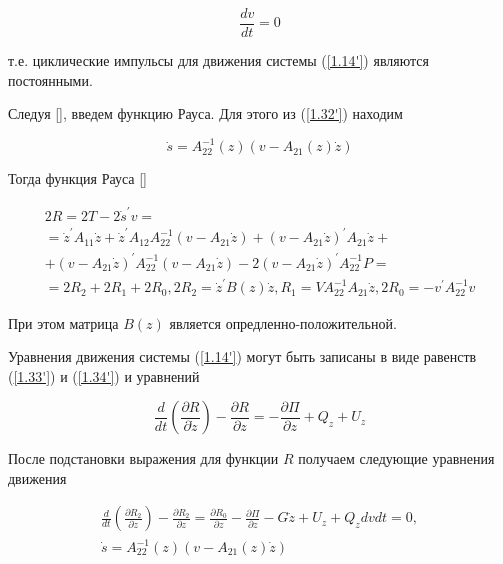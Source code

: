 \begin{equation} \label{1.33'}
\frac{d v}{d t} = 0
\end{equation}

т.е. циклические импульсы для движения системы (\ref{1.14'}) являются постоянными.

Следуя [], введем функцию Рауса. Для этого из (\ref{1.32'}) находим

\begin{equation} \label{1.34'}
\dot s = A_{22}^{-1} (z) (v - A_{21} (z) \dot z)
\end{equation}

Тогда функция Рауса [] 

\begin{equation} \label{1.35'}
\begin{array}{c}
	2R = 2T - 2 \dot s^{'} v =\\
	= \dot z^{'} A_{11} \dot z + \dot z^{'} A_{12} A_{22}^{-1} (v - A_{21} \dot z) + (v - A_{21} \dot z)^{'} A_{21} \dot z +\\
	+ (v - A_21 \dot z)^{'} A_{22}^{-1} (v - A_{21} \dot z) - 2 (v - A_{21} \dot z)^{'} A_{22}^{-1} P =\\
	= 2 R_2 + 2 R_1 + 2 R_0, 2 R_2 = \dot z^{'} B (z) \dot z, R_1 = V A_{22}^{-1} A_{21} \dot z, 2 R_0 = - v^{'} A_{22}^{-1} v
\end{array}
\end{equation}

При этом матрица $B(z)$ является опредленно-положительной.

Уравнения движения системы (\ref{1.14'}) могут быть записаны в виде равенств (\ref{1.33'}) и (\ref{1.34'}) и уравнений

\begin{equation} \label{1.36'}
\frac{d}{dt} (\frac{\partial R}{\partial \dot z}) - \frac{\partial R}{\partial z} = - \frac{\partial \Pi}{\partial z} + Q_z + U_z
\end{equation}

После подстановки выражения для функции $R$ получаем следующие уравнения движения 

\begin{equation} \label{1.37'}
\begin{array}{c}
\frac{d}{dt} (\frac{\partial R_2}{\partial \dot z}) - \frac{\partial R_2}{\partial z} = \frac{\partial R_0}{\partial z} - \frac{\partial \Pi}{\partial z} - G \dot z + U_z + Q_z {d v}{d t} = 0,\\
\dot s = A_{22}^{-1} (z) (v - A_{21} (z) \dot z)
\end{array}
\end{equation}

